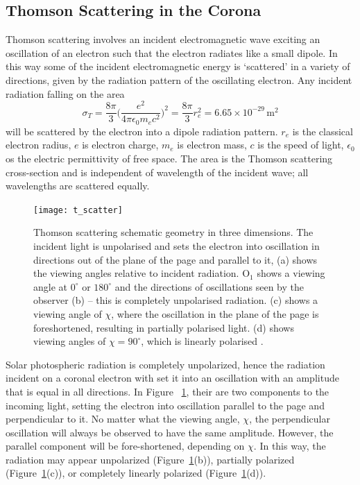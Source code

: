 \subsection{Thomson Scattering in the Corona}\label{sec:10}
\doublespacing
Thomson scattering involves an incident electromagnetic wave exciting an oscillation of an electron such that the electron radiates like a small dipole. In this way some of the incident electromagnetic energy is `scattered' in a variety of directions, given by the radiation pattern of the oscillating electron. Any incident radiation falling on the area
\begin{equation}
\sigma_T = \frac{8\pi}{3}\bigg(  \frac{e^2}{4\pi\epsilon_0 m_e c^2}   \bigg)^2 = \frac{8\pi}{3}r_e^2 = 6.65\times10^{-29}\,\mathrm{m}^2
\end{equation}
will be scattered by the electron into a dipole radiation pattern. $r_e$ is the classical electron radius, $e$ is electron charge, $m_e$ is electron mass, $c$ is the speed of light, $\epsilon_0$ os the electric permittivity of free space. The area is the Thomson scattering cross-section and is independent of wavelength of the incident wave; all wavelengths are scattered equally. 

\begin{figure}[!t]
\begin{center}
\texttt{[image: t\_scatter]}
\caption[Thomson scattering schematic.]{Thomson scattering schematic geometry in three dimensions. The incident light is unpolarised and sets the electron into oscillation in directions out of the plane of the page and parallel to it, (a) shows the viewing angles relative to incident radiation. O$_1$ shows a viewing angle at $0^{\circ}$ or $180^{\circ}$ and the directions of oscillations seen by the observer (b) -- this is completely unpolarised radiation. (c) shows a viewing angle of $\chi$, where the oscillation in the plane of the page is foreshortened, resulting in partially polarised light. (d) shows viewing angles of $\chi=90^{\circ}$, which is linearly polarised \citep{howtap2009}.}
\label{fig:tscatter}
\end{center}
\end{figure}
Solar photospheric radiation is completely unpolarized, hence the radiation incident on a coronal electron with set it into an oscillation with an amplitude that is equal in all directions. In Figure ~\ref{fig:tscatter}, their are two components to the incoming light, setting the electron into oscillation parallel to the page and perpendicular to it. No matter what the viewing angle, $\chi$, the perpendicular oscillation will always be observed to have the same amplitude. However, the parallel component will be fore-shortened, depending on $\chi$. In this way, the radiation may appear unpolarized (Figure~\ref{fig:tscatter}(b)), partially polarized (Figure~\ref{fig:tscatter}(c)), or completely linearly polarized (Figure~\ref{fig:tscatter}(d)).


